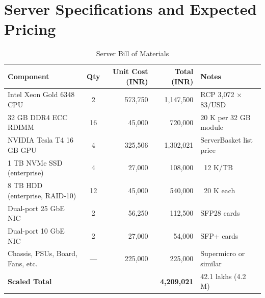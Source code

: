 \documentclass[12pt]{report}
\begin{document}
\section{Server Specifications and Expected Pricing}
\begin{table}[H]
  \centering
  \footnotesize
  \setlength{\tabcolsep}{2pt} %
  \begin{tabular}{@{} l c r r l @{}}
    \toprule
    \textbf{Component} & \textbf{Qty} & \textbf{Unit Cost (INR)} & \textbf{Total (INR)} & \textbf{Notes} \\
    \midrule
    Intel Xeon Gold 6348 CPU         & 2  & 573,750 & 1,147,500 & RCP 3,072 × 83/USD \\
    32 GB DDR4 ECC RDIMM             & 16 & 45,000  & 720,000   & 20 K per 32 GB module \\
    NVIDIA Tesla T4 16 GB GPU        & 4  & 325,506 & 1,302,021 & ServerBasket list price \\
    1 TB NVMe SSD (enterprise)       & 4  & 27,000  & 108,000   & ~12 K/TB \\
    8 TB HDD (enterprise, RAID-10)   & 12 & 45,000  & 540,000   & ~20 K each \\
    Dual-port 25 GbE NIC             & 2  & 56,250  & 112,500   & SFP28 cards \\
    Dual-port 10 GbE NIC             & 2  & 27,000  & 54,000    & SFP+ cards \\
    Chassis, PSUs, Board, Fans, etc. & —  & 225,000 & 225,000   & Supermicro or similar \\
    \midrule
    \textbf{Scaled Total}            &    &         & \textbf{4,209,021} & 42.1 lakhs (4.2 M) \\
    \bottomrule
  \end{tabular}
  \caption{Server Bill of Materials}
\end{table}

\clearpage
\end{document}

